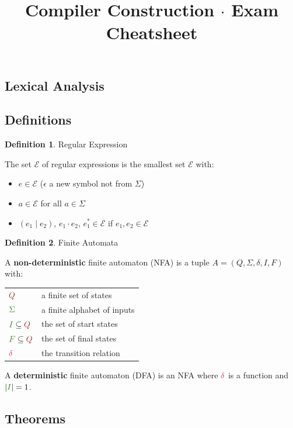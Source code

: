 \documentclass[10pt, landscape]{article}
\title{Compiler Construction $\cdot$ Exam Cheatsheet}
\author{}
\date{}
\theoremstyle{definition}
\newtheorem{definition}{Definition}[section]
\newcommand{\Set}[1]{\textcolor{OliveGreen}{#1}}
\newcommand{\Alphabet}{\Set{\Sigma}}
\newcommand{\trans}{%
  { \textcolor{WildStrawberry}{\delta} }
}
\newcommand{\statecolor}{Maroon}
\newcommand{\states}{\textcolor{\statecolor}{Q}}
\begin{document}
\begin{multicols*}{3}

\section{Lexical Analysis}

\subsection*{Definitions}

\begin{definition}{Regular Expression}

  The set $\mathcal{E}$ of regular expressions is the smallest set $\mathcal{E}$ with:

  \begin{itemize}
    \item $e \in \mathcal{E}$ ($\epsilon$ a new symbol not from $\Sigma$)
    \item $a \in \mathcal{E}$ for all $a \in \Sigma$
    \item $(e_{1} \mid e_{2})$, $e_{1}\cdot e_{2}$, $e_{1}^{*} \in \mathcal{E}$ if $e_{1}, e_{2} \in \mathcal{E}$
  \end{itemize}
\end{definition}

\begin{definition}{Finite Automata}

  A \textbf{non-deterministic} finite automaton (NFA) is a tuple $A = (Q, \Sigma, \delta, I, F)$ with:
  \begin{center}
    \begin{tabular}{l l}
      $\states$ & a finite set of states \\
      $\Alphabet$ & a finite alphabet of inputs \\
      $\Set{I} \subseteq \states$ & the set of start states \\
      $\Set{F} \subseteq \states$ & the set of final states \\
      $\trans$ & the transition relation \\

    \end{tabular}
  \end{center}

  A \textbf{deterministic} finite automaton (DFA) is an NFA where $\trans$ is a function and $|\Set{I}| = 1$.
\end{definition}


\subsection*{Theorems}


\end{multicols*}
\end{document}
